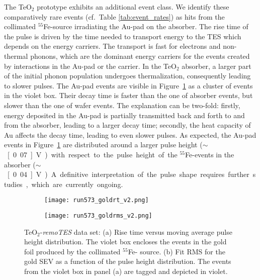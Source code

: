 \documentclass[superscriptaddress,nofootinbib ]{revtex4-2}
\begin{document}
The TeO$_2$ prototype exhibits an additional event class. We identify these comparatively rare events (cf.~Table \ref{tab:event_rates}) as hits from the collimated $^{55}$Fe-source irradiating the Au-pad on the absorber. The rise time of the pulse is driven by the time needed to transport energy to the TES which depends on the energy carriers. The transport is fast for electrons and non-thermal phonons, which are the dominant energy carriers for the events created by interactions in the Au-pad or the carrier. In the TeO$_2$ absorber, a larger part of the initial phonon population undergoes thermalization, consequently leading to slower pulses. The Au-pad events are visible in Figure~\ref{fig:gold_risetime} as a cluster of events in the violet box. Their decay time is faster than the one of absorber events, but slower than the one of wafer events. The explanation can be two-fold: firstly, energy deposited in the Au-pad is partially transmitted back and forth to and from the absorber, leading to a larger decay time; secondly, the heat capacity of Au affects the decay time, leading to even slower pulses. As expected, the Au-pad events in Figure~\ref{fig:gold_risetime} are distributed around a larger pulse height ($\sim$~\unit[0.07]{V}) with respect to the pulse height of the $^{55}$Fe-events in the absorber ($\sim$~\unit[0.04]{V}). A definitive interpretation of the pulse shape requires further studies, which are currently ongoing.


\begin{figure}[!htb]
\centering
\begin{subfigure}[b]{0.49\textwidth}
   \texttt{[image: run573\_goldrt\_v2.png]}
   \caption{}
   \label{fig:gold_risetime}
\end{subfigure}
\hfill
\begin{subfigure}[b]{0.49\textwidth}
   \texttt{[image: run573\_goldrms\_v2.png]}
   \caption{}
   \label{fig:fit_rms}
\end{subfigure}
  \caption{TeO$_2$-\textit{remoTES} data set: (a) Rise time versus moving average pulse height distribution. The violet box encloses the events in the gold foil produced by the collimated $^{55}$Fe-
 source. (b) Fit RMS for the gold SEV as a function of the pulse height distribution. The events from the violet box in  panel (a) are tagged and depicted in violet.}
  \label{fig:gold_rms}
\end{figure}
\end{document}
